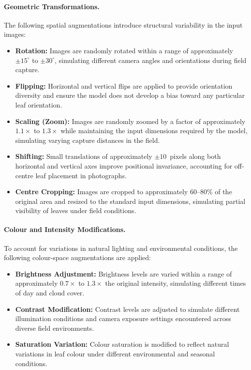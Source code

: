 \documentclass[12pt,a4paper]{report}
\begin{document}
\paragraph{Geometric Transformations.}
The following spatial augmentations introduce structural variability in the input images:
\begin{itemize}
    \item \textbf{Rotation:} Images are randomly rotated within a range of approximately $\pm 15^\circ$ to $\pm 30^\circ$, simulating different camera angles and orientations during field capture.
    \item \textbf{Flipping:} Horizontal and vertical flips are applied to provide orientation diversity and ensure the model does not develop a bias toward any particular leaf orientation.
    \item \textbf{Scaling (Zoom):} Images are randomly zoomed by a factor of approximately $1.1\times$ to $1.3\times$ while maintaining the input dimensions required by the model, simulating varying capture distances in the field.
    \item \textbf{Shifting:} Small translations of approximately $\pm 10$~pixels along both horizontal and vertical axes improve positional invariance, accounting for off-centre leaf placement in photographs.
    \item \textbf{Centre Cropping:} Images are cropped to approximately 60--80\% of the original area and resized to the standard input dimensions, simulating partial visibility of leaves under field conditions.
\end{itemize}

\paragraph{Colour and Intensity Modifications.}
To account for variations in natural lighting and environmental conditions, the following colour-space augmentations are applied:
\begin{itemize}
    \item \textbf{Brightness Adjustment:} Brightness levels are varied within a range of approximately $0.7\times$ to $1.3\times$ the original intensity, simulating different times of day and cloud cover.
    \item \textbf{Contrast Modification:} Contrast levels are adjusted to simulate different illumination conditions and camera exposure settings encountered across diverse field environments.
    \item \textbf{Saturation Variation:} Colour saturation is modified to reflect natural variations in leaf colour under different environmental and seasonal conditions.
\end{itemize}
\end{document}
